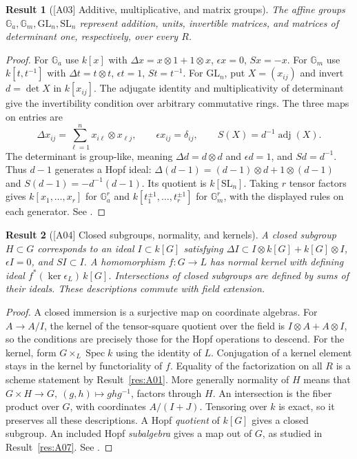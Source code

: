 \documentclass[11pt,a4paper,openany,oneside]{book}
\theoremstyle{resultstyle}
\newtheorem{statement}{Result}[chapter]
\newenvironment{result}[2]{\clubpenalty=10000\begin{statement}[\textnormal{[#1]} #2]\leavevmode\label{res:#1}\ignorespaces}{\end{statement}}
\theoremstyle{definition}
\numberwithin{equation}{chapter}
\begin{document}
\begin{result}{A03}{Additive, multiplicative, and matrix groups}
The affine groups \(\mathbb G_a,\mathbb G_m,\mathrm{GL}_n,\mathrm{SL}_n\)
represent addition, units, invertible matrices, and matrices of determinant
one, respectively, over every \(R\).
\end{result}

\begin{proof}
For \(\mathbb G_a\) use \(k[x]\) with
\(\Delta x=x\otimes1+1\otimes x\), \(\epsilon x=0\), \(Sx=-x\).
For \(\mathbb G_m\) use \(k[t,t^{-1}]\) with
\(\Delta t=t\otimes t\), \(\epsilon t=1\), \(St=t^{-1}\).
For \(\mathrm{GL}_n\), put \(X=(x_{ij})\) and invert \(d=\det X\) in
\(k[x_{ij}]\). The adjugate identity and multiplicativity of determinant
give the invertibility condition over arbitrary commutative rings. The
three maps on entries are
\[
 \Delta x_{ij}=\sum_{\ell=1}^n x_{i\ell}\otimes x_{\ell j},\qquad
 \epsilon x_{ij}=\delta_{ij},\qquad S(X)=d^{-1}\operatorname{adj}(X).
\]
The determinant is group-like, meaning \(\Delta d=d\otimes d\) and
\(\epsilon d=1\), and \(Sd=d^{-1}\). Thus \(d-1\) generates a Hopf ideal:
\(\Delta(d-1)=(d-1)\otimes d+1\otimes(d-1)\) and
\(S(d-1)=-d^{-1}(d-1)\). Its quotient is \(k[\mathrm{SL}_n]\).
Taking \(r\) tensor factors gives \(k[x_1,\ldots,x_r]\) for \(\mathbb G_a^r\)
and \(k[t_1^{\pm1},\ldots,t_r^{\pm1}]\) for \(\mathbb G_m^r\), with
the displayed rules on each generator. See \cite[\S\S2.a, 3.a]{milne}.
\end{proof}

\begin{result}{A04}{Closed subgroups, normality, and kernels}
A closed subgroup \(H\subset G\) corresponds to an ideal \(I\subset k[G]\)
satisfying
\(\Delta I\subset I\otimes k[G]+k[G]\otimes I\),
\(\epsilon I=0\), and \(S I\subset I\). A homomorphism \(f:G\to L\) has
normal kernel with defining ideal \(f^*(\ker\epsilon_L)\, k[G]\).
Intersections of closed subgroups are defined by sums of their ideals.
These descriptions commute with field extension.
\end{result}

\begin{proof}
A closed immersion is a surjective map on coordinate algebras. For
\(A\to A/I\), the kernel of the tensor-square quotient over the field is
\(I\otimes A+A\otimes I\), so the conditions are precisely those for
the Hopf operations to descend. For the kernel, form
\(G\times_L\operatorname{Spec}k\) using the identity of \(L\).
Conjugation of a kernel element stays in the kernel by functoriality of
\(f\). Equality of the factorization on all \(R\) is a scheme statement
by Result~\ref{res:A01}. More generally normality of \(H\) means that
\(G\times H\to G,\ (g,h)\mapsto ghg^{-1}\), factors through \(H\).
An intersection is the fiber product over \(G\), with coordinates
\(A/(I+J)\). Tensoring over \(k\) is exact, so it preserves all these
descriptions. A Hopf \emph{quotient} of \(k[G]\) gives a closed subgroup.
An included Hopf \emph{subalgebra} gives a map out of \(G\), as studied in
Result~\ref{res:A07}. See \cite[Propositions 1.41, 1.49, 3.9--3.15 and \S1.e]{milne}.
\end{proof}
\end{document}
